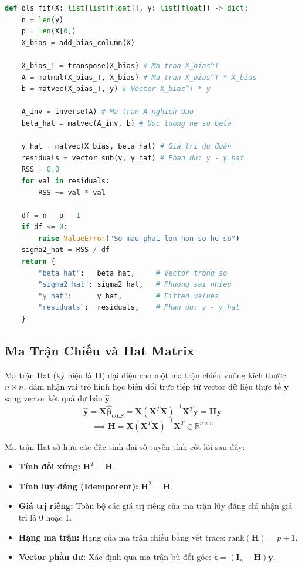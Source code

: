 \documentclass[12pt,a4paper]{report}
\begin{document}
\begin{lstlisting}[language=Python]
def ols_fit(X: list[list[float]], y: list[float]) -> dict:
    n = len(y)
    p = len(X[0])
    X_bias = add_bias_column(X)

    X_bias_T = transpose(X_bias) # Ma tran X_bias^T
    A = matmul(X_bias_T, X_bias) # Ma tran X_bias^T * X_bias
    b = matvec(X_bias_T, y) # Vector X_bias^T * y

    A_inv = inverse(A) # Ma tran A nghich đao
    beta_hat = matvec(A_inv, b) # Uoc luong he so beta

    y_hat = matvec(X_bias, beta_hat) # Gia tri du đoán
    residuals = vector_sub(y, y_hat) # Phan du: y - y_hat
    RSS = 0.0
    for val in residuals:
        RSS += val * val

    df = n - p - 1
    if df <= 0:
        raise ValueError("So mau phai lon hon so he so")
    sigma2_hat = RSS / df
    return {
        "beta_hat":   beta_hat,     # Vector trong so
        "sigma2_hat": sigma2_hat,   # Phuong sai nhieu
        "y_hat":      y_hat,        # Fitted values
        "residuals":  residuals,    # Phan du: y - y_hat
    }
\end{lstlisting}
\subsection{Ma Trận Chiếu và Hat Matrix}

Ma trận Hat (ký hiệu là $\mathbf{H}$) đại diện cho một ma trận chiếu vuông kích thước $n \times n$, đảm nhận vai trò hình học biến đổi trực tiếp từ vector dữ liệu thực tế $\mathbf{y}$ sang vector kết quả dự báo $\hat{\mathbf{y}}$:
\begin{equation}
    \hat{\mathbf{y}} = \mathbf{X}\hat{\boldsymbol{\beta}}_{OLS} = \mathbf{X}(\mathbf{X}^T\mathbf{X})^{-1}\mathbf{X}^T\mathbf{y} = \mathbf{H}\mathbf{y}
\end{equation}
\begin{equation}
    \implies \mathbf{H} = \mathbf{X}(\mathbf{X}^T\mathbf{X})^{-1}\mathbf{X}^T \in \mathbb{R}^{n \times n}
\end{equation}

Ma trận Hat sở hữu các đặc tính đại số tuyến tính cốt lõi sau đây:
\begin{itemize}
    \item \textbf{Tính đối xứng:} $\mathbf{H}^T = \mathbf{H}$.
    \item \textbf{Tính lũy đẳng (Idempotent):} $\mathbf{H}^2 = \mathbf{H}$.
    \item \textbf{Giá trị riêng:} Toàn bộ các giá trị riêng của ma trận lũy đẳng chỉ nhận giá trị là 0 hoặc 1.
    \item \textbf{Hạng ma trận:} Hạng của ma trận chiếu bằng vết trace: $\text{rank}(\mathbf{H}) = p+1$.
    \item \textbf{Vector phần dư:} Xác định qua ma trận bù đối góc: $\hat{\boldsymbol{\epsilon}} = (\mathbf{I}_n - \mathbf{H})\mathbf{y} $.
\end{itemize}
\end{document}
